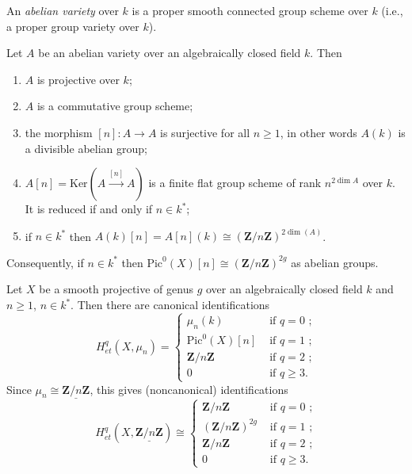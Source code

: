 \begin{definition}
\label{definition-abelian-variety}
An {\it abelian variety} over $k$ is a proper smooth connected group scheme
over $k$ (i.e., a proper group variety over $k$).
\end{definition}

\begin{proposition}
\label{proposition-review-abelian-varieties}
Let $A$ be an abelian variety over an algebraically closed field $k$. Then
\begin{enumerate}
\item
$A$ is projective over $k$;
\item
$A$ is a commutative group scheme;
\item
the morphism $[n]: A\to A$ is surjective for all $n\geq 1$, in other words
$A(k)$ is a divisible abelian group;
\item
$A[n] = \text{Ker}(A\xrightarrow{[n]} A)$ is a finite flat group scheme of rank
$n^{2\dim A}$ over $k$. It is reduced if and only if $n\in k^*$;
\item
if $n\in k^*$ then $A(k)[n] = A[n](k)\cong(\mathbf{Z}/n\mathbf{Z})^{2\dim(A)}$.
\end{enumerate}
\end{proposition}

\noindent
Consequently, if $n\in k^*$ then $\text{Pic}^0(X)[n] \cong
\left(\mathbf{Z}/n\mathbf{Z}\right)^{2g}$ as abelian groups.

\begin{lemma}
\label{lemma-cohomology-smooth-projective-curve}
Let $X$ be a smooth projective of genus $g$ over an algebraically closed field
$k$ and $n\geq 1$, $n\in k^*$. Then there are canonical identifications
$$
H_{et}^q(X, \mu_n) =
\left\{
\begin{matrix}
\mu_n(k) & \text{ if $q=0$ ;} \\
\text{Pic}^0(X)[n] & \text{ if $q=1$ ;} \\
\mathbf{Z}/n\mathbf{Z} & \text{ if $q=2$ ;}\\
0 & \text{ if $q \geq 3$.}
\end{matrix}
\right.
$$
Since $\mu_n \cong \underline{\mathbf{Z}/n\mathbf{Z}}$, this gives
(noncanonical) identifications
$$
H_{et}^q(X, \underline{\mathbf{Z}/n\mathbf{Z}}) \cong
\left\{
\begin{matrix}
\mathbf{Z}/n\mathbf{Z} & \text{ if $q=0$ ;} \\
(\mathbf{Z}/n\mathbf{Z})^{2g} & \text{ if $q=1$ ;} \\
\mathbf{Z}/n\mathbf{Z} & \text{ if $q=2$ ;}\\
0 & \text{ if $q \geq 3$.}
\end{matrix}
\right.
$$
\end{lemma}	

